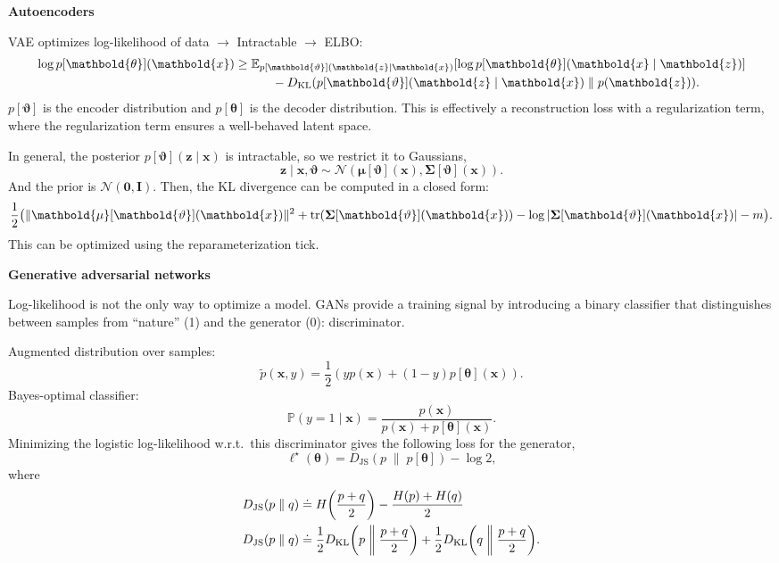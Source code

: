 \documentclass[10pt]{article}
\newenvironment{topic}[1]
{\textbf{\sffamily \footnotesize \colorbox{black}{\rlap{\textbf{\textcolor{white}{#1}}}\hspace{\linewidth}\hspace{-2\fboxsep}}}}
{}
\newenvironment{subtopic}[1]
{\vspace{0.1cm} \begin{center}\textbf{\footnotesize \sffamily #1}\end{center}}
{}
\renewcommand{\det}[1]{|#1|}
\renewcommand{\mat}[1]{\ensuremath{\mathbf{#1}}}
\renewcommand{\vec}[1]{\ensuremath{\mathbold{#1}}}
\begin{document}
\begin{multicols*}{3}
\begin{topic}{Generative models}
\begin{subtopic}{Autoencoders}
            VAE optimizes log-likelihood of data $\to$ Intractable $\to$ ELBO:
            \begin{align*}
                \log p[\vec{\theta}](\vec{x}) & \geq \E_{p[\vec{\vartheta}](\vec{z} \mid \vec{x})} [\log p[\vec{\theta}](\vec{x} \mid \vec{z})] \\
                                              & \quad \quad \quad - D_{\mathrm{KL}}(p[\vec{\vartheta}](\vec{z} \mid \vec{x}) \;\|\; p(\vec{z})).
            \end{align*}
            $p[\vec{\vartheta}]$ is the encoder distribution and $p[\vec{\theta}]$ is the decoder
            distribution. This is effectively a reconstruction loss with a regularization term, where
            the regularization term ensures a well-behaved latent space.

            In general, the posterior $p[\vec{\vartheta}](\vec{z} \mid \vec{x})$ is intractable, so we restrict
            it to Gaussians, \[
                \vec{z} \mid \vec{x}, \vec{\vartheta} \sim \mathcal{N}(\vec{\mu}[\vec{\vartheta}](\vec{x}), \mat{\Sigma}[\vec{\vartheta}](\vec{x})).
            \]
            And the prior is $\mathcal{N}(\vec{0}, \mat{I})$. Then, the KL divergence can be computed in a
            closed form: \[
                \frac{1}{2} \lft( \| \vec{\mu}[\vec{\vartheta}](\vec{x}) \|^2 + \tr{\mat{\Sigma}[\vec{\vartheta}](\vec{x})} - \log \det{\mat{\Sigma}[\vec{\vartheta}](\vec{x})} - m \rgt).
            \]
            This can be optimized using the reparameterization tick.
        \end{subtopic}

        \begin{subtopic}{Generative adversarial networks}
            Log-likelihood is not the only way to optimize a model. GANs provide a training signal by
            introducing a binary classifier that distinguishes between samples from ``nature'' (1) and the
            generator (0): discriminator.

            Augmented distribution over samples: \[
                \tilde{p}(\vec{x},y) = \frac{1}{2} (yp(\vec{x}) + (1-y)p[\vec{\theta}](\vec{x})).
            \]
            Bayes-optimal classifier: \[
                \mathbb{P}(y=1 \mid \vec{x}) = \frac{p(\vec{x})}{p(\vec{x}) + p[\vec{\theta}](\vec{x})}.
            \]
            Minimizing the logistic log-likelihood w.r.t.\ this discriminator gives the following loss for the
            generator, \[
                \ell^\star(\vec{\theta}) = D_{\mathrm{JS}}(p \;\|\; p[\vec{\theta}]) - \log 2,
            \]
            where
            \begin{align*}
                D_{\mathrm{JS}}(p \;\|\; q) & \doteq H\lft(\frac{p + q}{2} \rgt) - \frac{H(p) + H(q)}{2} \\
                D_{\mathrm{JS}}(p \;\|\; q) & \doteq \frac{1}{2} D_{\mathrm{KL}}\lft( p \;\middle\|\; \frac{p+q}{2} \rgt) + \frac{1}{2} D_{\mathrm{KL}}\lft( q \;\middle\|\; \frac{p+q}{2} \rgt).
            \end{align*}


\end{subtopic}
\end{topic}
\end{multicols*}
\end{document}
